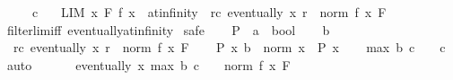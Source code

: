 \begin{isabellebody}
\ \ \ {\isachardoublequoteopen}{}\ {\isasymle}\ c{\isachardoublequoteclose}\isanewline
\ \ \ {\isachardoublequoteopen}{\isacharparenleft}{\kern0pt}LIM\ x\ F{\isachardot}{\kern0pt}\ f\ x\ {\isacharcolon}{\kern0pt}{\isachargreater}{\kern0pt}\ at{\isacharunderscore}{\kern0pt}infinity{\isacharparenright}{\kern0pt}\ {\isasymlongleftrightarrow}\ {\isacharparenleft}{\kern0pt}{\isasymforall}r{\isachargreater}{\kern0pt}c{\isachardot}{\kern0pt}\ eventually\ {\isacharparenleft}{\kern0pt}{\isasymlambda}x{\isachardot}{\kern0pt}\ r\ {\isasymle}\ norm\ {\isacharparenleft}{\kern0pt}f\ x{\isacharparenright}{\kern0pt}{\isacharparenright}{\kern0pt}\ F{\isacharparenright}{\kern0pt}{\isachardoublequoteclose}\isanewline
%
\isadelimproof
\ \ %
\endisadelimproof
%
\isatagproof
{}\isamarkupfalse%
\ filterlim{\isacharunderscore}{\kern0pt}iff\ eventually{\isacharunderscore}{\kern0pt}at{\isacharunderscore}{\kern0pt}infinity\isanewline
{}\isamarkupfalse%
\ safe\isanewline
\ \ \isamarkupfalse%
\ P\ {\isacharcolon}{\kern0pt}{\isacharcolon}{\kern0pt}\ {\isachardoublequoteopen}{\isacharprime}{\kern0pt}a\ {\isasymRightarrow}\ bool{\isachardoublequoteclose}\isanewline
\ \ \isamarkupfalse%
\ b\isanewline
\ \ \isamarkupfalse%
\ {\isacharasterisk}{\kern0pt}{\isacharcolon}{\kern0pt}\ {\isachardoublequoteopen}{\isasymforall}r{\isachargreater}{\kern0pt}c{\isachardot}{\kern0pt}\ eventually\ {\isacharparenleft}{\kern0pt}{\isasymlambda}x{\isachardot}{\kern0pt}\ r\ {\isasymle}\ norm\ {\isacharparenleft}{\kern0pt}f\ x{\isacharparenright}{\kern0pt}{\isacharparenright}{\kern0pt}\ F{\isachardoublequoteclose}\isanewline
\ \ \isamarkupfalse%
\ P{\isacharcolon}{\kern0pt}\ {\isachardoublequoteopen}{\isasymforall}x{\isachardot}{\kern0pt}\ b\ {\isasymle}\ norm\ x\ {\isasymlongrightarrow}\ P\ x{\isachardoublequoteclose}\isanewline
\ \ \isamarkupfalse%
\ {\isachardoublequoteopen}max\ b\ {\isacharparenleft}{\kern0pt}c\ {\isacharplus}{\kern0pt}\ {}{\isacharparenright}{\kern0pt}\ {\isachargreater}{\kern0pt}\ c{\isachardoublequoteclose}\ \isamarkupfalse%
\ auto\isanewline
\ \ \isamarkupfalse%
\ {\isacharasterisk}{\kern0pt}\ \isamarkupfalse%
\ {\isachardoublequoteopen}eventually\ {\isacharparenleft}{\kern0pt}{\isasymlambda}x{\isachardot}{\kern0pt}\ max\ b\ {\isacharparenleft}{\kern0pt}c\ {\isacharplus}{\kern0pt}\ {}{\isacharparenright}{\kern0pt}\ {\isasymle}\ norm\ {\isacharparenleft}{\kern0pt}f\ x{\isacharparenright}{\kern0pt}{\isacharparenright}{\kern0pt}\ F{\isachardoublequoteclose}\isanewline

\end{isabellebody}
